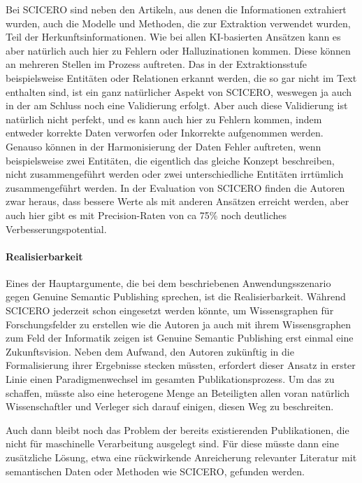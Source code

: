 Bei SCICERO sind neben den Artikeln, aus denen die Informationen extrahiert wurden, auch die Modelle und Methoden, die zur Extraktion verwendet wurden, Teil der Herkunftsinformationen.
Wie bei allen KI-basierten Ansätzen kann es aber natürlich auch hier zu Fehlern oder Halluzinationen kommen.
Diese können an mehreren Stellen im Prozess auftreten.
Das in der Extraktionsstufe beispielsweise Entitäten oder Relationen erkannt werden, die so gar nicht im Text enthalten sind, ist ein ganz natürlicher Aspekt von SCICERO, weswegen ja auch in der am Schluss noch eine Validierung erfolgt.
Aber auch diese Validierung ist natürlich nicht perfekt, und es kann auch hier zu Fehlern kommen, indem entweder korrekte Daten verworfen oder Inkorrekte aufgenommen werden.
Genauso können in der Harmonisierung der Daten Fehler auftreten, wenn beispielsweise zwei Entitäten, die eigentlich das gleiche Konzept beschreiben, nicht zusammengeführt werden oder zwei unterschiedliche Entitäten irrtümlich zusammengeführt werden.
In der Evaluation von SCICERO finden die Autoren zwar heraus, dass bessere Werte als mit anderen Ansätzen erreicht werden, aber auch hier gibt es mit Precision-Raten von ca 75\% noch deutliches Verbesserungspotential.


\paragraph{Realisierbarkeit}

Eines der Hauptargumente, die bei dem beschriebenen Anwendungsszenario gegen Genuine Semantic Publishing sprechen, ist die Realisierbarkeit.
Während SCICERO jederzeit schon eingesetzt werden könnte, um Wissensgraphen für Forschungsfelder zu erstellen \textemdash wie die Autoren ja auch mit ihrem Wissensgraphen zum Feld der Informatik zeigen \cite{cskg} \textemdash ist Genuine Semantic Publishing erst einmal eine Zukunftsvision.
Neben dem Aufwand, den Autoren zukünftig in die Formalisierung ihrer Ergebnisse stecken müssten, erfordert dieser Ansatz in erster Linie einen Paradigmenwechsel im gesamten Publikationsprozess.
Um das zu schaffen, müsste also eine heterogene Menge an Beteiligten \textemdash allen voran natürlich Wissenschaftler und Verleger \textemdash sich darauf einigen, diesen Weg zu beschreiten.

Auch dann bleibt noch das Problem der bereits existierenden Publikationen, die nicht für maschinelle Verarbeitung ausgelegt sind.
Für diese müsste dann eine zusätzliche Lösung, etwa eine rückwirkende Anreicherung relevanter Literatur mit semantischen Daten oder Methoden wie SCICERO, gefunden werden.

